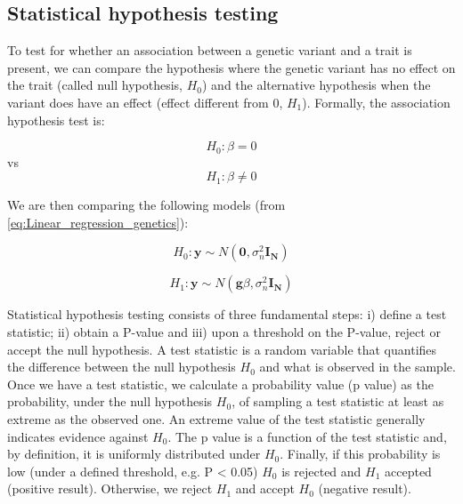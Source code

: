 
\newpage

\subsection{Statistical hypothesis testing}

To test for whether an association between a genetic variant and a trait is present, we can compare the hypothesis where the genetic variant has no effect on the trait (called null hypothesis, $H_0$) and the alternative hypothesis when the variant does have an effect (effect different from 0, $H_1$).
Formally, the association hypothesis test is:

\begin{equation}\label{eq:null_hypothesis}
 H_{0}: \beta=0 
\end{equation}
vs
\begin{equation}\label{eq:alternative_hypothesis}
 H_{1}: \beta \neq 0 
\end{equation}

We are then comparing the following models (from \eqref{eq:Linear_regression_genetics}):

\begin{equation}\label{eq:null_hypothesis_regression}
 H_0: \mathbf{y} \sim N(\mathbf{0}, \sigma_n^{2} \mathbf{I_N}) 
\end{equation}

\begin{equation}\label{eq:alternative_hypothesis_regression}
 H_1: \mathbf{y} \sim N(\mathbf{g}\beta,\sigma_n^{2} \mathbf{I_N}) 
\end{equation}

Statistical hypothesis testing consists of three fundamental steps: i) define a test statistic; ii) obtain a P-value and iii) upon a threshold on the P-value, reject or accept the null hypothesis. 
A test statistic is a random variable that quantifies the difference between the null hypothesis $H_0$ and what is observed in the sample. 
Once we have a test statistic, we calculate a probability value (p value) as the probability, under the null hypothesis $H_0$, of sampling a test statistic at least as extreme as the observed one. 
An extreme value of the test statistic generally indicates evidence against $H_0$.
The p value is a function of the test statistic and, by definition, it is uniformly distributed under $H_0$.
Finally, if this probability is low (under a defined threshold, e.g. P < 0.05) $H_0$ is rejected and $H_1$ accepted (positive result).
Otherwise, we reject $H_1$ and accept $H_0$ (negative result).\\


